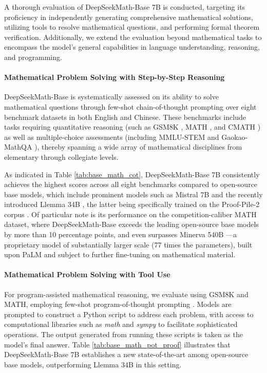 A thorough evaluation of DeepSeekMath-Base 7B is conducted, targeting its proficiency in independently generating comprehensive mathematical solutions, utilizing tools to resolve mathematical questions, and performing formal theorem verification. Additionally, we extend the evaluation beyond mathematical tasks to encompass the model’s general capabilities in language understanding, reasoning, and programming.

\paragraph{Mathematical Problem Solving with Step-by-Step Reasoning}

DeepSeekMath-Base is systematically assessed on its ability to solve mathematical questions through few-shot chain-of-thought prompting \citep{cot} over eight benchmark datasets in both English and Chinese. These benchmarks include tasks requiring quantitative reasoning (such as GSM8K \citep{gsm8k}, MATH \citep{MATH}, and CMATH \citep{wei2023cmath}) as well as multiple-choice assessments (including MMLU-STEM \citep{mmlu} and Gaokao-MathQA \citep{agieval}), thereby spanning a wide array of mathematical disciplines from elementary through collegiate levels.

As indicated in Table \ref{tab:base_math_cot}, DeepSeekMath-Base 7B consistently achieves the highest scores across all eight benchmarks compared to open-source base models, which include prominent models such as Mistral 7B \citep{mistral} and the recently introduced Llemma 34B \citep{llemma}, the latter being specifically trained on the Proof-Pile-2 corpus \citep{llemma}. Of particular note is its performance on the competition-caliber MATH dataset, where DeepSeekMath-Base exceeds the leading open-source base models by more than 10 percentage points, and even surpasses Minerva 540B \citep{minerva}—a proprietary model of substantially larger scale (77 times the parameters), built upon PaLM \citep{palm} and subject to further fine-tuning on mathematical material.

\paragraph{Mathematical Problem Solving with Tool Use} 
For program-assisted mathematical reasoning, we evaluate using GSM8K and MATH, employing few-shot program-of-thought prompting \citep{pot,pal}. Models are prompted to construct a Python script to address each problem, with access to computational libraries such as \textit{math} and \textit{sympy} to facilitate sophisticated operations. The output generated from running these scripts is taken as the model’s final answer. Table \ref{tab:base_math_pot_proof} illustrates that DeepSeekMath-Base 7B establishes a new state-of-the-art among open-source base models, outperforming Llemma 34B in this setting.

